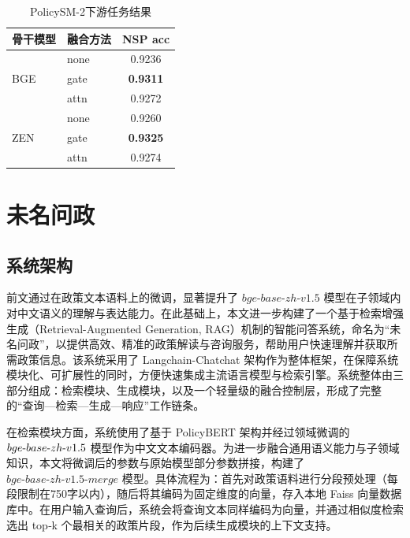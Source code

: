 \documentclass[12pt, a4paper]{ctexart}
\begin{document}
  \begin{table}[htbp]
    \renewcommand{\arraystretch}{1}
    \centering
    \caption{PolicySM-2下游任务结果}
    \begin{tabular}{llc}
      \toprule
      骨干模型 & 融合方法 & NSP acc \\
      \midrule
      \multirow{3}{*}{BGE}
        & none & 0.9236 \\
        & gate & \textbf{0.9311} \\
        & attn & 0.9272 \\
      \midrule
      \multirow{3}{*}{ZEN}
        & none & 0.9260 \\
        & gate & \textbf{0.9325} \\
        & attn & 0.9274 \\
      \bottomrule
    \end{tabular}
    \label{tab:nsp-results}
  \end{table}

\newpage
\section{未名问政}

\subsection{系统架构}

前文通过在政策文本语料上的微调，显著提升了 $bge\text{-}base\text{-}zh\text{-}v1.5$ 模型在子领域内对中文语义的理解与表达能力。在此基础上，本文进一步构建了一个基于检索增强生成（Retrieval-Augmented Generation, RAG）机制的智能问答系统，命名为“未名问政”，以提供高效、精准的政策解读与咨询服务，帮助用户快速理解并获取所需政策信息。该系统采用了 Langchain-Chatchat 架构作为整体框架，在保障系统模块化、可扩展性的同时，方便快速集成主流语言模型与检索引擎。系统整体由三部分组成：检索模块、生成模块，以及一个轻量级的融合控制层，形成了完整的“查询—检索—生成—响应”工作链条。

在检索模块方面，系统使用了基于 PolicyBERT 架构并经过领域微调的 $bge\text{-}base\text{-}\\zh\text{-}v1.5$ 模型作为中文文本编码器。为进一步融合通用语义能力与子领域知识，本文将微调后的参数与原始模型部分参数拼接，构建了 $bge\text{-}base\text{-}zh\text{-}v1.5\text{-}merge$ 模型。具体流程为：首先对政策语料进行分段预处理（每段限制在750字以内），随后将其编码为固定维度的向量，存入本地 Faiss 向量数据库中。在用户输入查询后，系统会将查询文本同样编码为向量，并通过相似度检索选出 top‑k 个最相关的政策片段，作为后续生成模块的上下文支持。
\end{document}
